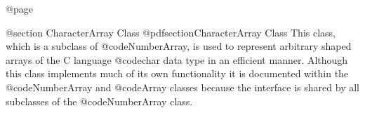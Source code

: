 @page

@section  CharacterArray Class
@pdfsection{CharacterArray Class}
This class, which is a subclass of @code{NumberArray}, is used to
represent arbitrary shaped arrays of the C language @code{char} data
type in an efficient manner.  Although this class implements much of its
own functionality it is documented within the @code{NumberArray} and
@code{Array} classes because the interface is shared by all subclasses
of the @code{NumberArray} class.






